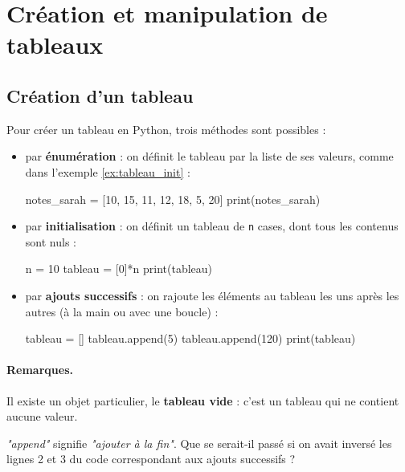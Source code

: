\documentclass[12pt]{article}                   %
\theoremstyle{exercicestyle}
\theoremstyle{break2}
\theoremstyle{break3}
\begin{document}
\pagebreak

\section{Création et manipulation de tableaux}

\subsection{Création d'un tableau}

\begin{definition}
    Pour créer un tableau en Python, trois méthodes sont possibles :
    \begin{itemize}[label=\textbullet]
        \item par \textbf{énumération} : on définit le tableau par la liste de ses valeurs, comme dans l'exemple \ref{ex:tableau_init} :
\begin{pyconsole}[][frame=single, framesep=2mm, label=Console Python,linenos=true]
notes_sarah = [10, 15, 11, 12, 18, 5, 20]
print(notes_sarah)
\end{pyconsole}
        \item par \textbf{initialisation} : on définit un tableau de \texttt{n} cases, dont tous les contenus sont nuls :
\begin{pyconsole}[][frame=single, framesep=2mm, label=Console Python,linenos=true]
n = 10
tableau = [0]*n
print(tableau)
\end{pyconsole}
        \item par \textbf{ajouts successifs} : on rajoute les éléments au tableau les uns après les autres (à la main ou avec une boucle) :
\begin{pyconsole}[][frame=single, framesep=2mm, label=Console Python,linenos=true]
tableau = []
tableau.append(5)
tableau.append(120)
print(tableau)
\end{pyconsole}
    \end{itemize}
\end{definition} 

\paragraph{Remarques.} Il existe un objet particulier, le \textbf{tableau vide} : c'est un tableau qui ne contient aucune valeur.

\textit{"append"} signifie \textit{"ajouter à la fin"}. Que se serait-il passé si on avait inversé les lignes 2 et 3 du code correspondant aux ajouts successifs ?
\end{document}
